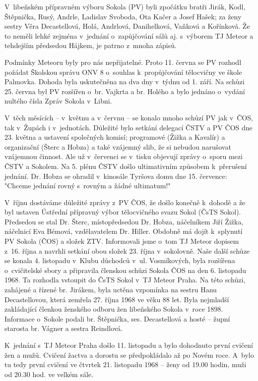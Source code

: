 \documentclass[a5paper, 12pt, twoside]{article}
\begin{document}
V~libeňském přípravném výboru Sokola (PV) byli zpočátku bratři Jirák,
Kodl, Štěpnička, Rusý, Andrle, Ladislav Svoboda, Ota Kačer a Josef
Hašek; za ženy sestry Věra Decastellová, Holá, Andrlová, Danihelková,
Vaňková a Kořínková. Že to neměli lehké zejména v~jednání o~zapůjčování
sálů aj. s~výborem TJ Meteor a tehdejším předsedou Hájkem, je patrno
z~mnoha zápisů.

Podmínky Meteoru byly pro nás nepřijatelné. Proto 11. června se PV
rozhodl požádat Školskou správu ONV 8 o~souhlas k~propůjčování
tělocvičny ve škole Palmovka. Dohoda byla uskutečněna na dva dny v~týdnu
od 1. září. Na schůzi 25. června byl PV rozšířen o~br. Vajkrta a br.
Holého a bylo jednáno o~vydání nultého čísla Zpráv Sokola v~Libni.

V~těch měsících -- v~květnu a v~červnu -- se konalo mnoho schůzí PV jak
v~ČOS, tak v~Župách i v~jednotách. Důležité bylo setkání delegací ČSTV a
PV ČOS dne 23. května a ustavení společných komisí; programové (Žižka a
Kavalír) a organizační (Šterc a Hobza) a také vzájemný slib, že si
nebudou narušovat vzájemnou činnost. Ale už v~červenci se v~tisku
objevují zprávy o~sporu mezi ČSTV a Sokolem. Na 5. plénu ČSTV došlo
ultimativním způsobem k~přerušení jednání. Dr. Hobza se ohradil
v~kinosále Tyršova domu dne 15. července: "Chceme jednání rovný s~rovným a
žádné ultimatum!{}"

V~říjnu dostáváme důležité zprávy z~PV ČOS, že došlo konečně k~dohodě a
že byl ustaven Ústřední přípravný výbor tělocvičného svazu Sokol (ČsTS
Sokol). Předsedou se stal Dr. Šterc, místopředsedou Dr. Hobza,
náčelníkem Jiří Žižka, náčelnicí Eva Bémová, vzdělavatelem Dr. Hiller.
Obdobně má dojít k~splynutí PV Sokola (ČOS) a složek ZTV. Informovali
jsme o~tom TJ Meteor dopisem z~16. října a navrhli setkání obou složek
23. října v~sokolovně. Naše další schůze se konala 4. listopadu v~Klubu
důchodců v~ul. Vosmíkových, byla rozšířena o~cvičitelské sbory a
připravila členskou schůzi Sokola ČOS na den 6. listopadu 1968. Ta
rozhodla vstoupit do ČsTS Sokol v~TJ Meteor Praha. Na této schůzi,
zahájené a řízené br. Jirákem, byla uctěna vzpomínka na sestru Hanu
Decastellovou, která zemřela 27. října 1968 ve věku 88 let. Byla
nejmladší zakládající členkou ženského odboru žen libeňského Sokola
v~roce 1898. Informace o~Sokole podali br. Štěpnička, ses. Decastellová a
hosté -- župní starosta br. Vágner a sestra Reindlová.

K~jednání s~TJ Meteor Praha došlo 11. listopadu a bylo dohodnuto první
cvičení žen a mužů. Cvičení žactva a dorostu se předpokládalo až po
Novém roce. A~bylo tu tedy první cvičení ve čtvrtek 21. listopadu 1968
-- ženy od 19.00 hodin, muži od 20.30 hod. ve velkém sále.
\end{document}
